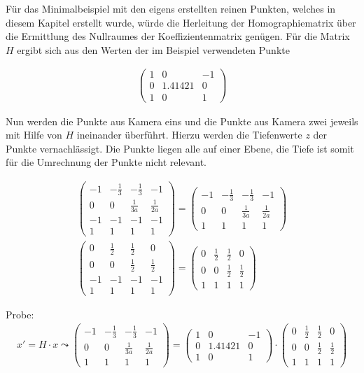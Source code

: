 Für das Minimalbeispiel mit den eigens erstellten reinen Punkten, welches in diesem Kapitel erstellt wurde, würde die Herleitung der Homographiematrix über die Ermittlung des Nullraumes der Koeffizientenmatrix genügen. Für die Matrix $H$ ergibt sich aus den Werten der im Beispiel verwendeten Punkte

\begin{gather}
	\begin{pmatrix}
	1&0&-1\\
	0&1.41421&0\\
	1&0&1
	\end{pmatrix}
\end{gather}

Nun werden die Punkte aus Kamera eins und die Punkte aus Kamera zwei jeweils mit Hilfe von $H$ ineinander überführt. Hierzu werden die Tiefenwerte $z$ der Punkte vernachlässigt. Die Punkte liegen alle auf einer Ebene, die Tiefe ist somit für die Umrechnung der Punkte nicht relevant.

\begin{gather}
		\begin{pmatrix}
	-1&-\frac{1}{3}&-\frac{1}{3}&-1\\
	0&0&\frac{1}{3a}&\frac{1}{2a}\\
	-1&-1&-1&-1\\
	1&1&1&1
	\end{pmatrix}
	=
		\begin{pmatrix}
	-1&-\frac{1}{3}&-\frac{1}{3}&-1\\
	0&0&\frac{1}{3a}&\frac{1}{2a}\\
	1&1&1&1
	\end{pmatrix}\\
		\begin{pmatrix}
	0&\frac{1}{2}&\frac{1}{2}&0\\
	0&0&\frac{1}{2}&\frac{1}{2}\\
	-1&-1&-1&-1\\
	1&1&1&1
	\end{pmatrix}
	=
		\begin{pmatrix}
	0&\frac{1}{2}&\frac{1}{2}&0\\
	0&0&\frac{1}{2}&\frac{1}{2}\\
	1&1&1&1
	\end{pmatrix}
\end{gather}

Probe:
\begin{gather}
x'=H \cdot x \leadsto 
	\begin{pmatrix}
	-1&-\frac{1}{3}&-\frac{1}{3}&-1\\
	0&0&\frac{1}{3a}&\frac{1}{2a}\\
	1&1&1&1
\end{pmatrix}= 	\begin{pmatrix}
1&0&-1\\
0&1.41421&0\\
1&0&1
\end{pmatrix}
\cdot
		\begin{pmatrix}
0&\frac{1}{2}&\frac{1}{2}&0\\
0&0&\frac{1}{2}&\frac{1}{2}\\
1&1&1&1
\end{pmatrix}
\end{gather}

